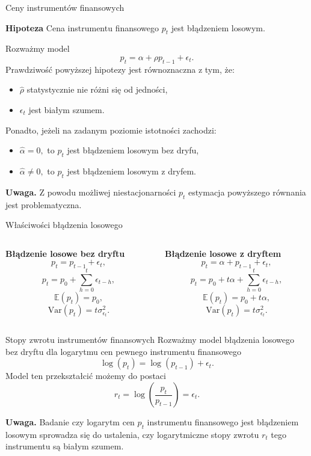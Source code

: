 \documentclass[a4paper, 11pt]{beamer}
\begin{document}
	\begin{frame}{Ceny instrumentów finansowych}
		\begin{block}{\textbf{Hipoteza}}
			Cena instrumentu finansowego $p_t$ jest błądzeniem losowym.
		\end{block}
		Rozważmy model \[
			p_t = \alpha + \rho p_{t-1} + \epsilon_t.
		\]
		Prawdziwość powyższej hipotezy jest równoznaczna z tym, że:
		\begin{itemize}
			\item $\hat{\rho}$ statystycznie nie różni się od jedności,
			\item $\epsilon_t$ jest białym szumem.
		\end{itemize}
		Ponadto, jeżeli na zadanym poziomie istotności zachodzi:
		\begin{itemize}
			\item $\hat{\alpha} = 0,$ to $p_t$ jest błądzeniem losowym bez dryfu,
			\item $\hat{\alpha} \neq 0,$ to $p_t$ jest błądzeniem losowym z dryfem.
		\end{itemize}
		\begin{alert}{\textbf{Uwaga.}}
			Z powodu możliwej niestacjonarności $p_t$ estymacja powyższego równania
			jest problematyczna.
		\end{alert}
	\end{frame}
	
	\begin{frame}{Właściwości błądzenia losowego}
		\begin{columns}[onlytextwidth]
			\begin{column}{0.5\textwidth}
				\textbf{Błądzenie losowe bez dryftu} \[
					p_t = p_{t-1} + \epsilon_t,
				\] \[
					p_t = p_0 + \sum_{h=0}^{t} \epsilon_{t-h},
				\] \[
					\mathbb{E}\left(p_t\right) = p_0,
				\] \[
					\mbox{Var}\left(p_t\right) = t \sigma^2_{\epsilon_t}.
				\]
			\end{column}
			\begin{column}{0.5\textwidth}
				\textbf{Błądzenie losowe z dryftem} \[
					p_t = \alpha + p_{t-1} + \epsilon_t,
				\] \[
					p_t = p_0 + t \alpha + \sum_{h=0}^{t} \epsilon_{t-h},
				\] \[
					\mathbb{E}\left(p_t\right) = p_0 + t \alpha,
				\] \[
					\mbox{Var}\left(p_t\right) = t \sigma^2_{\epsilon_t}.
				\]
			\end{column}
		\end{columns}
	\end{frame}
	
	\begin{frame}{Stopy zwrotu instrumentów finansowych}
		Rozważmy model błądzenia losowego bez dryftu dla logarytmu cen pewnego instrumentu finansowego \[
			\log\left(p_t\right) = \log\left(p_{t-1}\right) + \epsilon_t.
		\] Model ten przekształcić możemy do postaci \[
			r_t = \log\left(\frac{p_t}{p_{t-1}}\right) = \epsilon_t.
		\]
		\begin{alert}{\textbf{Uwaga.}}
			Badanie czy logarytm cen $p_t$ instrumentu finansowego jest błądzeniem losowym
			sprowadza się do ustalenia, czy logarytmiczne stopy zwrotu $r_t$ tego instrumentu są białym szumem.
		\end{alert}
	\end{frame}
	
\end{document}

